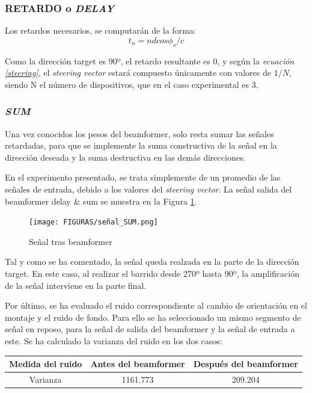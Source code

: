 \documentclass[a4paper,11pt]{book}
\begin{document}
\subsubsection{RETARDO o \textit{DELAY}}
Los retardos necesarios, se computarán de la forma:
\begin{equation}
t_{n} = n d cos\phi_{s} / c
\end{equation}

Como la dirección target es 90º, el retardo resultante es 0, y según la \textit{ecuación \ref{steering}}, el \textit{steering vector} estará compuesto únicamente con valores de $1/N$, siendo N el número de dispositivos, que en el caso experimental es 3.

\subsubsection{\textit{SUM}}
Una vez conocidos los pesos del beamformer, solo resta sumar las señales retardadas, para que se implemente la suma constructiva de la señal en la dirección deseada y la suma destructiva en las demás direcciones.

En el experimento presentado, se trata simplemente de un promedio de las señales de entrada, debido a los valores del \textit{steering vector}. La señal salida del beamformer delay \& sum se muestra en la Figura \ref{sum}.

\begin{figure}[hbtp]
\centering
\texttt{[image: FIGURAS/señal\_SUM.png]}
\caption{Señal tras beamformer}
\label{sum}
\end{figure}

Tal y como se ha comentado, la señal queda realzada en la parte de la dirección target. En este caso, al realizar el barrido desde 270º hasta 90º, la amplificación de la señal interviene en la parte final.

Por último, se ha evaluado el ruido correspondiente al cambio de orientación en el montaje y el ruido de fondo. Para ello se ha seleccionado un mismo segmento de señal en reposo, para la señal de salida del beamformer y la señal de entrada a este. Se ha calculado la varianza del ruido en los dos casos:
\linebreak

\begin{tabular}{|c|c|c|}
\hline 
\textbf{Medida del ruido} & Antes del beamformer & Después del beamformer \\ 
\hline 
Varianza & 1161.773 & 209.204 \\ 
\hline 
\end{tabular} 
\linebreak
\end{document}
